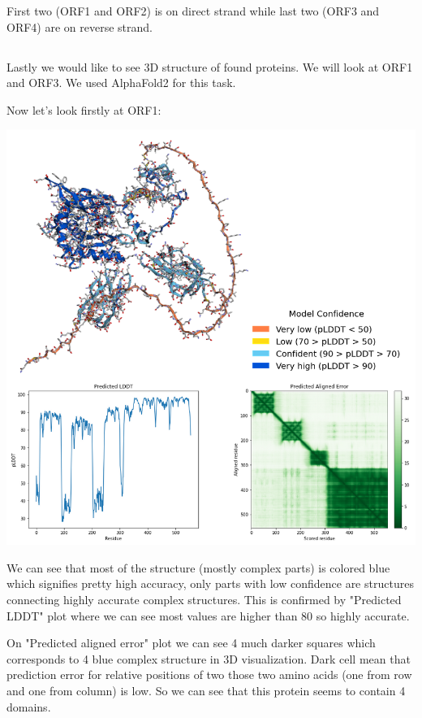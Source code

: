 \documentclass[a4paper]{article}
\begin{document}
	First two (ORF1 and ORF2) is on direct strand while last two (ORF3 and ORF4) are on reverse strand.
	
	\subsection{}
	
	Lastly we would like to see 3D structure of found proteins. We will look at ORF1 and ORF3. We used AlphaFold2 for this task.
	
	Now let's look firstly at ORF1:
	
	\centerline{\includegraphics[width=1\textwidth]{orf1}}
	
	We can see that most of the structure (mostly complex parts) is colored blue which signifies pretty high accuracy, only parts with low confidence are structures connecting highly accurate complex structures. This is confirmed by "Predicted LDDT" plot where we can see most values are higher than 80 so highly accurate.
	
	On "Predicted aligned error" plot we can see 4 much darker squares which corresponds to 4 blue complex structure in 3D visualization. Dark cell mean that prediction error for relative positions of two those two amino acids (one from row and one from column) is low. So we can see that this protein seems to contain 4 domains.
	
\end{document}

